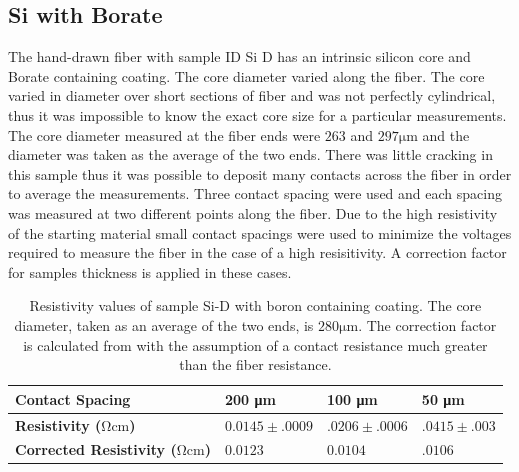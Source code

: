 \FloatBarrier
\subsection{Si with Borate}

The hand-drawn fiber with sample ID Si D has an intrinsic silicon core and Borate containing coating. The core diameter varied along the fiber. The core varied in diameter over short sections of fiber and was not perfectly cylindrical, thus it was impossible to know the exact core size for a particular measurements. The core diameter measured at the fiber ends were $263$ and $297 \si{\micro\meter}$ and the diameter was taken as the average of the two ends. There was little cracking in this sample thus it was possible to deposit many contacts across the fiber in order to average the measurements. Three contact spacing were used and each spacing was measured at two different points along the fiber. Due to the high resistivity of the starting material small contact spacings were used to minimize the voltages required to measure the fiber in the case of a high resisitivity. A correction factor for samples thickness is applied in these cases.

\begin{table}[!h]
\begin{center}
\begin{tabular}{ | l | l | l | l |}
\hline

\textbf{Contact Spacing}&\textbf{200 \si{\micro \meter}} & \textbf{100 \si{\micro \meter}} & \textbf{50 \si{\micro \meter}} \\ \hline
\textbf{Resistivity ($\si{\ohm \cm}$)}&$0.0145 \pm .0009$& $.0206 \pm .0006$& $.0415 \pm .003$\\\hline
\textbf{Corrected Resistivity ($\si{\ohm \cm}$)}&0$.0123$& $0.0104$ &$.0106$\\\hline
\end{tabular}
\end{center}
\caption{Resistivity values of sample Si-D  with boron containing coating. The core diameter, taken as an average of the two ends, is $280 \si{\micro \meter}$. The correction factor is calculated from \cite{Zimney2007CorrectionStudy} with the assumption of a contact resistance much greater than the fiber resistance.}
\label{Tabmb25}
\end{table}

